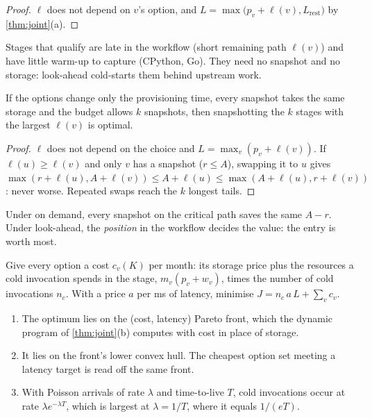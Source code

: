 \begin{proof}
$\ell$ does not depend on $v$'s option, and $L = \max\bigl(p_v + \ell(v), L_{\mathrm{rest}}\bigr)$
by \cref{thm:joint}(a).
\end{proof}

Stages that qualify are late in the workflow (short remaining path $\ell(v)$) and have little
warm-up to capture (CPython, Go). They need no snapshot and no storage: look-ahead cold-starts
them behind upstream work.

\begin{corollary}
\label{cor:tail}
If the options change only the provisioning time, every snapshot takes the same storage and the
budget allows $k$ snapshots, then snapshotting the $k$ stages with the largest $\ell(v)$ is
optimal.
\end{corollary}

\begin{proof}
$\ell$ does not depend on the choice and $L = \max_v (p_v + \ell(v))$. If $\ell(u) \ge \ell(v)$
and only $v$ has a snapshot ($r \le A$), swapping it to $u$ gives
$\max(r + \ell(u), A + \ell(v)) \le A + \ell(u) \le \max(A + \ell(u), r + \ell(v))$: never
worse. Repeated swaps reach the $k$ longest tails.
\end{proof}

Under on demand, every snapshot on the critical path saves the same $A - r$. Under look-ahead,
the \emph{position} in the workflow decides the value: the entry is worth most.

\begin{corollary}
\label{cor:price}
Give every option a cost $c_v(K)$ per month: its storage price plus the resources a cold
invocation spends in the stage, $m_v (p_v + w_v)$, times the number of cold invocations $n_c$.
With a price $a$ per ms of latency, minimise $J = n_c\, a\, L + \sum_v c_v$.
\begin{enumerate}[label=(\alph*)]
  \item The optimum lies on the (cost, latency) Pareto front, which the dynamic program of
        \cref{thm:joint}(b) computes with cost in place of storage.
  \item It lies on the front's lower convex hull. The cheapest option set meeting a latency
        target is read off the same front.
  \item With Poisson arrivals of rate $\lambda$ and time-to-live $T$, cold invocations occur at
        rate $\lambda e^{-\lambda T}$, which is largest at $\lambda = 1/T$, where it equals
        $1/(eT)$.
\end{enumerate}
\end{corollary}

